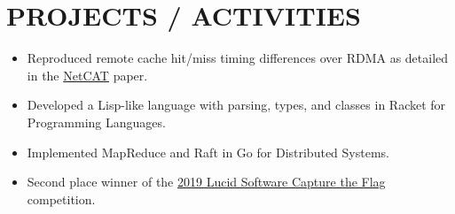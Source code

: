 \documentclass[10pt, letterpaper]{resume}
\begin{document}
\section{PROJECTS / ACTIVITIES}
\begin{itemize}
 \item Reproduced remote cache hit/miss timing differences over RDMA as detailed in the \href{https://download.vusec.net/papers/netcat_sp20.pdf}{NetCAT} paper.
 \item Developed a Lisp-like language with parsing, types, and classes in Racket for Programming Languages.
 \item Implemented MapReduce and Raft in Go for Distributed Systems.
 \item Second place winner of the \href{https://github.com/lucidsoftware/ctf2019}{2019 Lucid Software Capture the Flag} competition.
\end{itemize}
\end{document}
